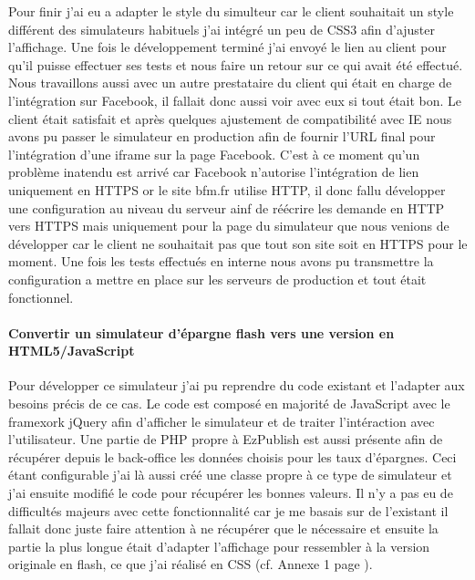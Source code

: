 \documentclass[a4paper,11pt,twoside]{report}
\begin{document}
      Pour finir j'ai eu a adapter le style du simulteur car le client souhaitait un style différent des simulateurs habituels j'ai intégré un peu de CSS3 afin d'ajuster l'affichage. Une fois le développement terminé j'ai envoyé le lien au client pour qu'il puisse effectuer ses tests et nous faire un retour sur ce qui avait été effectué. Nous travaillons aussi avec un autre prestataire du client qui était en charge de l'intégration sur Facebook, il fallait donc aussi voir avec eux si tout était bon. Le client était satisfait et après quelques ajustement de compatibilité avec IE nous avons pu passer le simulateur en production afin de fournir l'URL final pour l'intégration d'une iframe sur la page Facebook. C'est à ce moment qu'un problème inatendu est arrivé car Facebook n'autorise l'intégration de lien uniquement en HTTPS or le site bfm.fr utilise HTTP, il donc fallu développer une configuration au niveau du serveur ainf de réécrire les demande en HTTP vers HTTPS mais uniquement pour la page du simulateur que nous venions de développer car le client ne souhaitait pas que tout son site soit en HTTPS pour le moment. Une fois les tests effectués en interne nous avons pu transmettre la configuration a mettre en place sur les serveurs de production et tout était fonctionnel.
      
      \paragraph*{Convertir un simulateur d'épargne flash vers une version en HTML5/JavaScript}
      Pour développer ce simulateur j'ai pu reprendre du code existant et l'adapter aux besoins précis de ce cas. Le code est composé en majorité de JavaScript avec le framexork jQuery afin d'afficher le simulateur et de traiter l'intéraction avec l'utilisateur. Une partie de PHP propre à EzPublish est aussi présente afin de récupérer depuis le back-office les données choisis pour les taux d'épargnes. Ceci étant configurable j'ai là aussi créé une classe propre à ce type de simulateur et j'ai ensuite modifié le code pour récupérer les bonnes valeurs. Il n'y a pas eu de difficultés majeurs avec cette fonctionnalité car je me basais sur de l'existant il fallait donc juste faire attention à ne récupérer que le nécessaire et ensuite la partie la plus longue était d'adapter l'affichage pour ressembler à la version originale en flash, ce que j'ai réalisé en CSS (cf. Annexe 1 page \pageref{annexe1}).
\end{document}
